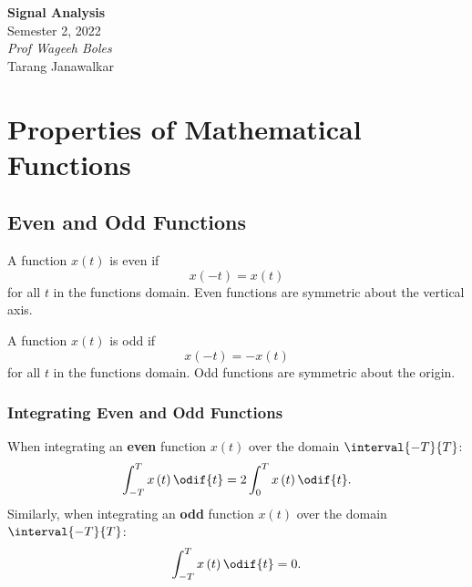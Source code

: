 \documentclass{article}
\date{}
\newcommand{\unitName}{Signal Analysis}
\newcommand{\unitTime}{Semester 2, 2022}
\newcommand{\unitCoordinator}{Prof Wageeh Boles}
\newcommand{\documentAuthors}{Tarang Janawalkar}
\begin{document}
%
\begin{titlepage}
    \vspace*{\fill}
    \begin{center}
        \LARGE{\textbf{\unitName}} \\[0.1in]
        \normalsize{\unitTime} \\[0.2in]
        \normalsize\textit{\unitCoordinator} \\[0.2in]
        \documentAuthors
    \end{center}
    \vspace*{\fill}
    \doclicenseThis
    \thispagestyle{empty}
\end{titlepage}
\newpage
%
\tableofcontents
\newpage
%
\section{Properties of Mathematical Functions}
\subsection{Even and Odd Functions}
\begin{definition}
    A function \(x\left( t \right)\) is even if
    \begin{equation*}
        x\left( -t \right) = x\left( t \right)
    \end{equation*}
    for all \(t\) in the functions domain. Even functions are symmetric about the vertical axis.
\end{definition}
\begin{definition}
    A function \(x\left( t \right)\) is odd if
    \begin{equation*}
        x\left( -t \right) = -x\left( t \right)
    \end{equation*}
    for all \(t\) in the functions domain. Odd functions are symmetric about the origin.
\end{definition}
\subsubsection{Integrating Even and Odd Functions}
When integrating an \textbf{even} function \(x\left( t \right)\) over the domain \(\interval{-T}{T}\):
\begin{equation*}
    \int_{-T}^T x\left( t \right) \odif{t} = 2 \int_0^T x\left( t \right) \odif{t}.
\end{equation*}
Similarly, when integrating an \textbf{odd} function \(x\left( t \right)\) over the domain \(\interval{-T}{T}\):
\begin{equation*}
    \int_{-T}^T x\left( t \right) \odif{t} = 0.
\end{equation*}
\end{document}

